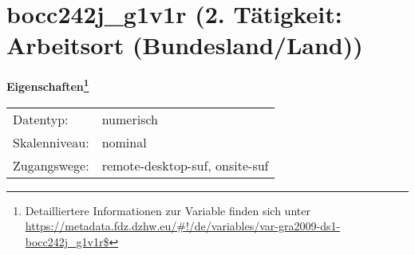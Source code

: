 
    \setcounter{footnote}{0}

    \vspace*{-1.8cm}
	\section{bocc242j\_g1v1r (2. Tätigkeit: Arbeitsort (Bundesland/Land))}
	\label{section:bocc242j_g1v1r}



    \vspace*{0.5cm}
    \noindent\textbf{Eigenschaften\footnote{Detailliertere Informationen zur Variable finden sich unter
		\url{https://metadata.fdz.dzhw.eu/\#!/de/variables/var-gra2009-ds1-bocc242j_g1v1r$}}}\\
	\begin{tabularx}{\hsize}{@{}lX}
	Datentyp: & numerisch \\
	Skalenniveau: & nominal \\
	Zugangswege: &
	  remote-desktop-suf, 
	  onsite-suf
 \\
    \end{tabularx}



